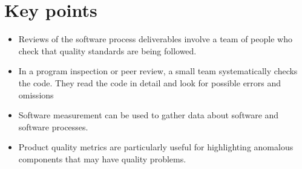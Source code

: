 \section {Key points}
\begin{itemize}


\item Reviews of the software process deliverables involve a team of people who check that quality standards are being followed.

\item In a program inspection or peer review, a small team systematically checks the code. They read the code in detail and look for possible errors and omissions

\item Software measurement can be used to gather data about software and software processes.

\item Product quality metrics are particularly useful for highlighting anomalous components that may have quality problems.
\end{itemize}


